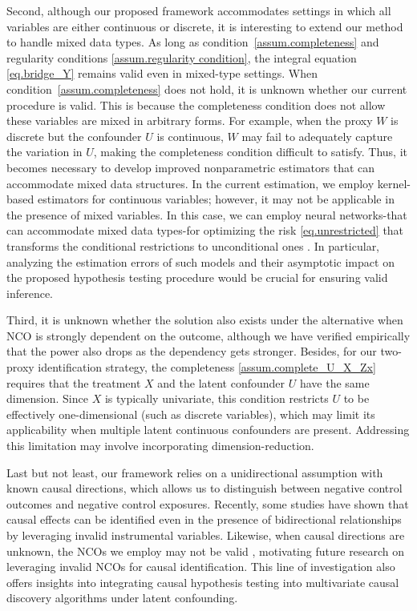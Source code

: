 \documentclass[
  12pt]{article}
\begin{document}
Second, although our proposed framework accommodates settings in which all variables are either continuous or discrete, it is interesting to extend our method to handle mixed data types. As long as condition~\ref{assum.completeness} and regularity conditions \ref{assum.regularity condition}, the integral equation \eqref{eq.bridge_Y} remains valid even in mixed-type settings. When condition~\ref{assum.completeness} does not hold, it is unknown whether our current procedure is valid. This is because the completeness condition does not allow these variables are mixed in arbitrary forms. For example, when the proxy $W$ is discrete but the confounder $U$ is continuous, $W$ may fail to adequately capture the variation in $U$, making the completeness condition difficult to satisfy. Thus, it becomes necessary to develop improved nonparametric estimators that can accommodate mixed data structures. In the current estimation, we employ kernel-based estimators for continuous variables; however, it may not be applicable in the presence of mixed variables. In this case, we can employ neural networks-that can accommodate mixed data types-for optimizing the risk \eqref{eq.unrestricted} that transforms the conditional restrictions to unconditional ones \citep{dikkala2020minimax,wudoubly2024}. In particular, analyzing the estimation errors of such models and their asymptotic impact on the proposed hypothesis testing procedure would be crucial for ensuring valid inference. 


Third, it is unknown whether the solution also exists under the alternative when NCO is strongly dependent on the outcome, although we have verified empirically that the power also drops as the dependency gets stronger. Besides, for our two-proxy identification strategy, the completeness \ref{assum.complete_U_X_Zx} requires that the treatment $X$ and the latent confounder $U$ have the same dimension. Since $X$ is typically univariate, this condition restricts $U$ to be effectively one-dimensional (such as discrete variables), which may limit its applicability when multiple latent continuous confounders are present. Addressing this limitation may involve incorporating dimension-reduction. 

Last but not least, our framework relies on a unidirectional assumption with known causal directions, which allows us to distinguish between negative control outcomes and negative control exposures. Recently, some studies \cite{li2024discovery} have shown that causal effects can be identified even in the presence of bidirectional relationships by leveraging invalid instrumental variables. Likewise, when causal directions are unknown, the NCOs we employ may not be valid \citep{yang2025double}, motivating future research on leveraging invalid NCOs for causal identification. This line of investigation also offers insights into integrating causal hypothesis testing into multivariate causal discovery algorithms \citep{spirtes2001causation} under latent confounding.
\end{document}
